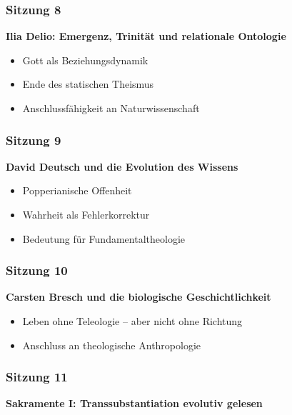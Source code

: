 \documentclass[
]{article}
\begin{document}
\subsubsection{\texorpdfstring{\textbf{Sitzung 8}}{Sitzung 8}}\label{sitzung-8}

\textbf{Ilia Delio: Emergenz, Trinität und relationale Ontologie}

\begin{itemize}
\item
  Gott als Beziehungsdynamik
\item
  Ende des statischen Theismus
\item
  Anschlussfähigkeit an Naturwissenschaft
\end{itemize}

\subsubsection{\texorpdfstring{\textbf{Sitzung 9}}{Sitzung 9}}\label{sitzung-9}

\textbf{David Deutsch und die Evolution des Wissens}

\begin{itemize}
\item
  Popperianische Offenheit
\item
  Wahrheit als Fehlerkorrektur
\item
  Bedeutung für Fundamentaltheologie
\end{itemize}

\subsubsection{\texorpdfstring{\textbf{Sitzung 10}}{Sitzung 10}}\label{sitzung-10}

\textbf{Carsten Bresch und die biologische Geschichtlichkeit}

\begin{itemize}
\item
  Leben ohne Teleologie -- aber nicht ohne Richtung
\item
  Anschluss an theologische Anthropologie
\end{itemize}

\subsubsection{\texorpdfstring{\textbf{Sitzung 11}}{Sitzung 11}}\label{sitzung-11}

\textbf{Sakramente I: Transsubstantiation evolutiv gelesen}
\end{document}
